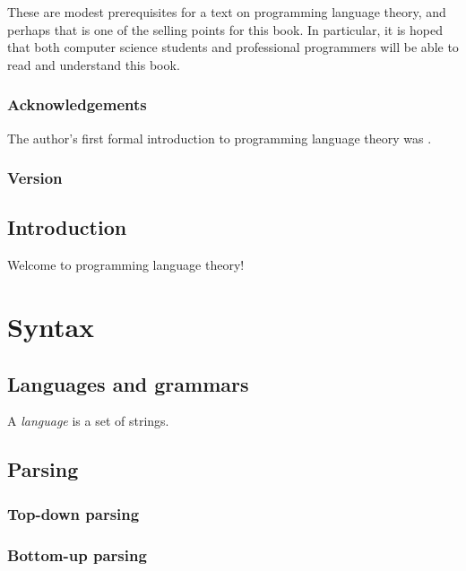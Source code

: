 \documentclass[oneside]{book}
\begin{document}
      These are modest prerequisites for a text on programming language theory, and perhaps that is one of the selling points for this book. In particular, it is hoped that both computer science students and professional programmers will be able to read and understand this book.

    \section*{Acknowledgements}

      The author's first formal introduction to programming language theory was \textcite{tapl}.

    \section*{Version}

      

  \tableofcontents

  \mainmatter

  \chapter{Introduction}

    Welcome to programming language theory!

  \part{Syntax}

    \chapter{Languages and grammars}

      A \emph{language} is a set of strings.

    \chapter{Parsing}

      \section{Top-down parsing}

      \section{Bottom-up parsing}
\end{document}

